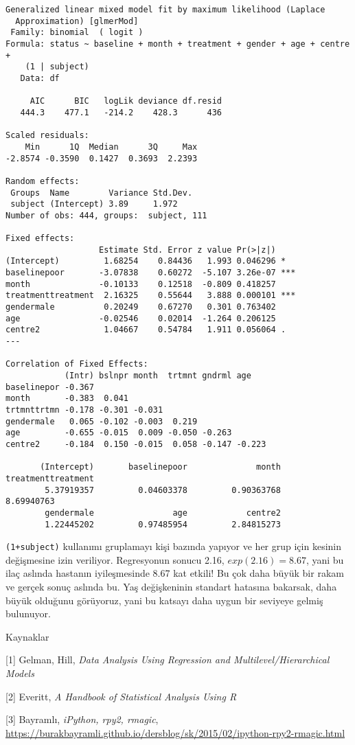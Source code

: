 \documentclass[12pt,fleqn]{article}\usepackage{../../common}
\begin{document}
\begin{verbatim}
Generalized linear mixed model fit by maximum likelihood (Laplace
  Approximation) [glmerMod]
 Family: binomial  ( logit )
Formula: status ~ baseline + month + treatment + gender + age + centre +  
    (1 | subject)
   Data: df

     AIC      BIC   logLik deviance df.resid 
   444.3    477.1   -214.2    428.3      436 

Scaled residuals: 
    Min      1Q  Median      3Q     Max 
-2.8574 -0.3590  0.1427  0.3693  2.2393 

Random effects:
 Groups  Name        Variance Std.Dev.
 subject (Intercept) 3.89     1.972   
Number of obs: 444, groups:  subject, 111

Fixed effects:
                   Estimate Std. Error z value Pr(>|z|)    
(Intercept)         1.68254    0.84436   1.993 0.046296 *  
baselinepoor       -3.07838    0.60272  -5.107 3.26e-07 ***
month              -0.10133    0.12518  -0.809 0.418257    
treatmenttreatment  2.16325    0.55644   3.888 0.000101 ***
gendermale          0.20249    0.67270   0.301 0.763402    
age                -0.02546    0.02014  -1.264 0.206125    
centre2             1.04667    0.54784   1.911 0.056064 .  
---

Correlation of Fixed Effects:
            (Intr) bslnpr month  trtmnt gndrml age   
baselinepor -0.367                                   
month       -0.383  0.041                            
trtmnttrtmn -0.178 -0.301 -0.031                     
gendermale   0.065 -0.102 -0.003  0.219              
age         -0.655 -0.015  0.009 -0.050 -0.263       
centre2     -0.184  0.150 -0.015  0.058 -0.147 -0.223

       (Intercept)       baselinepoor              month treatmenttreatment 
        5.37919357         0.04603378         0.90363768         8.69940763 
        gendermale                age            centre2 
        1.22445202         0.97485954         2.84815273 

\end{verbatim}

\verb!(1+subject)! kullanımı gruplamayı kişi bazında yapıyor ve her grup
için kesinin değişmesine izin veriliyor. Regresyonun sonucu 2.16,
$exp(2.16)=8.67$, yani bu ilaç aslında hastanın iyileşmesinde 8.67 kat
etkili! Bu çok daha büyük bir rakam ve gerçek sonuç aslında bu. Yaş
değişkeninin standart hatasına bakarsak, daha büyük olduğunu görüyoruz,
yani bu katsayı daha uygun bir seviyeye gelmiş bulunuyor.

Kaynaklar

[1] Gelman, Hill, {\em Data Analysis Using Regression and
  Multilevel/Hierarchical Models}

[2] Everitt, {\em A Handbook of Statistical Analysis Using R}

[3] Bayramlı, 
   {\em iPython, rpy2, rmagic}, 
   \url{https://burakbayramli.github.io/dersblog/sk/2015/02/ipython-rpy2-rmagic.html}
\end{document}
